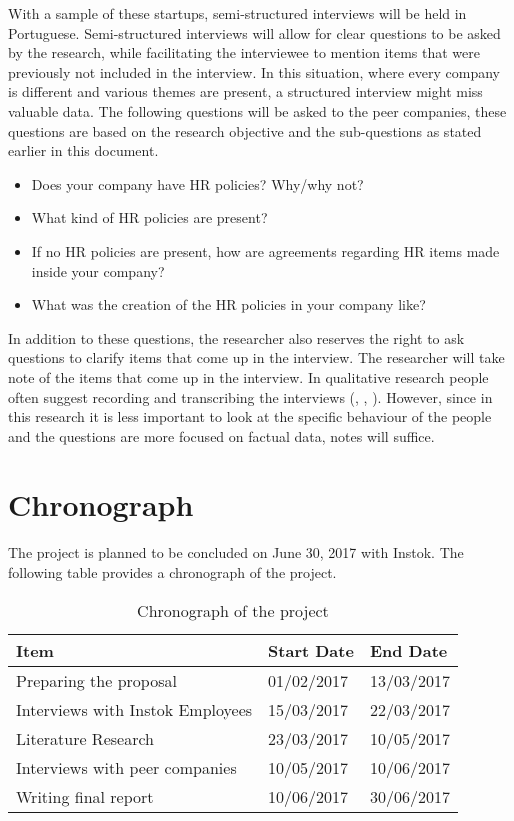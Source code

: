 \documentclass[man]{apa6}
\begin{document}
With a sample of these startups, semi-structured interviews will be held in Portuguese. Semi-structured interviews will allow for clear questions to be asked by the research, while facilitating the interviewee to mention items that were previously not included in the interview. In this situation, where every company is different and various themes are present, a structured interview might miss valuable data. The following questions will be asked to the peer companies, these questions are based on the research objective and the sub-questions as stated earlier in this document.
\begin{itemize}
\item Does your company have HR policies? Why/why not?
\item What kind of HR policies are present?
\item If no HR policies are present, how are agreements regarding HR items made inside your company?
\item What was the creation of the HR policies in your company like?
\end{itemize}

In addition to these questions, the researcher also reserves the right to ask questions to clarify items that come up in the interview. The researcher will take note of the items that come up in the interview. In qualitative research people often suggest recording and transcribing the interviews (\parencite{HUMBLE}, \parencite{BAILEY2008}, \parencite{THOMSON2014}). However, since in this research it is less important to look at the specific behaviour of the people and the questions are more focused on factual data, notes will suffice.

\section{Chronograph}
The project is planned to be concluded on June 30, 2017 with Instok. The following table provides a chronograph of the project.

\begin{table}[]
\centering
\caption{Chronograph of the project}
\label{chronograph}
\begin{tabular}{|l|l|l|}
\hline
Item                             & Start Date & End Date   \\ \hline
Preparing the proposal			 & 01/02/2017 & 13/03/2017 \\ \hline
Interviews with Instok Employees & 15/03/2017 & 22/03/2017 \\ \hline
Literature Research              & 23/03/2017 & 10/05/2017 \\ \hline
Interviews with  peer companies  & 10/05/2017 & 10/06/2017 \\ \hline
Writing final report             & 10/06/2017 & 30/06/2017 \\ \hline
\end{tabular}
\end{table}

\printbibliography

\end{document}
